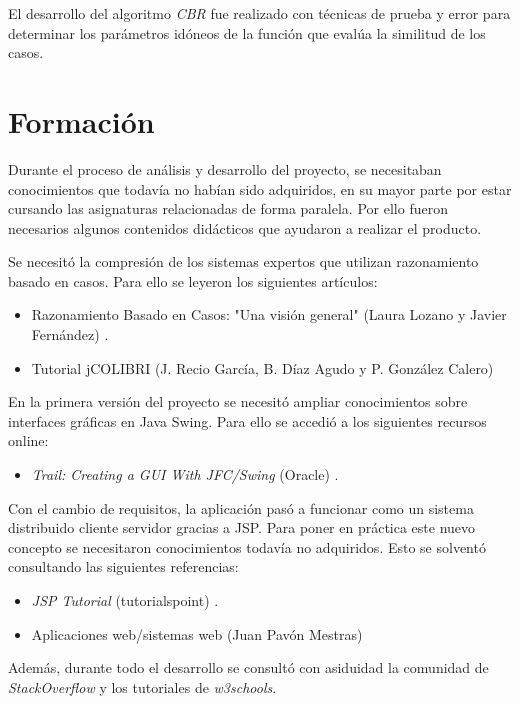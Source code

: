 El desarrollo del algoritmo \emph{CBR} fue realizado con técnicas de prueba y error para determinar los parámetros idóneos de la función que evalúa la similitud de los casos.

\section{Formación}

Durante el proceso de análisis y desarrollo del proyecto, se necesitaban conocimientos que todavía no habían sido adquiridos, en su mayor parte por estar cursando las asignaturas relacionadas de forma paralela. Por ello fueron necesarios algunos contenidos didácticos que ayudaron a realizar el producto.

Se necesitó la compresión de los sistemas expertos que utilizan razonamiento basado en casos. Para ello se leyeron los siguientes artículos:

\begin{itemize}
\tightlist
\item
Razonamiento Basado en Casos: "Una visión general" (Laura Lozano y Javier Fernández) \cite{cbr:art}.
\item
Tutorial jCOLIBRI (J. Recio García, B. Díaz Agudo y P. González Calero) \cite{colibri:tut}
\end{itemize}

En la primera versión del proyecto se necesitó ampliar conocimientos sobre interfaces gráficas en Java Swing. Para ello se accedió a los siguientes recursos online:

\begin{itemize}
\tightlist
\item
\emph{Trail: Creating a GUI With JFC/Swing} (Oracle) \cite{swing:tut}.
\end{itemize}

Con el cambio de requisitos, la aplicación pasó a funcionar como un sistema distribuido cliente servidor gracias a JSP. Para poner en práctica este nuevo concepto se necesitaron conocimientos todavía no adquiridos. Esto se solventó consultando las siguientes referencias:

\begin{itemize}
\tightlist
\item
\emph{JSP Tutorial} (tutorialspoint) \cite{jsp:tut}.
\item
Aplicaciones web/sistemas web (Juan Pavón Mestras) \cite{jsp:tut2}
\end{itemize}

Además, durante todo el desarrollo se consultó con asiduidad la comunidad de \emph{StackOverflow} y los tutoriales de \emph{w3schools}.

